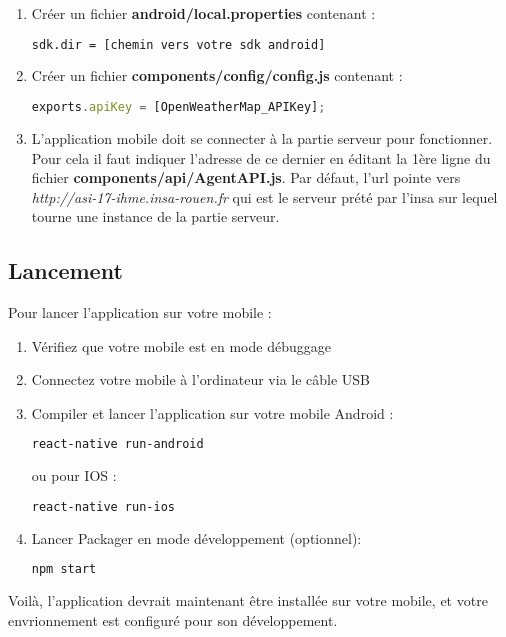 \begin{enumerate}
  \item Créer un fichier \textbf{android/local.properties} contenant :
  \begin{lstlisting}[language=bash]
  sdk.dir = [chemin vers votre sdk android]
  \end{lstlisting}
  \item Créer un fichier \textbf{components/config/config.js} contenant :
  \begin{lstlisting}[language=Javascript]
  exports.apiKey = [OpenWeatherMap_APIKey];
  \end{lstlisting}
  \item L'application mobile doit se connecter à la partie serveur pour fonctionner. Pour cela il faut indiquer l'adresse de ce dernier en
  éditant la 1ère ligne du fichier \textbf{components/api/AgentAPI.js}. Par défaut, l'url pointe vers \emph{http://asi-17-ihme.insa-rouen.fr} qui est le serveur prété
  par l'insa sur lequel tourne une instance de la partie serveur.
\end{enumerate}

\subsection{Lancement}

Pour lancer l'application sur votre mobile :
\begin{enumerate}
  \item Vérifiez que votre mobile est en mode débuggage
  \item Connectez votre mobile à l'ordinateur via le câble USB
  \item Compiler et lancer l'application sur votre mobile Android :
  \begin{lstlisting}[language=bash]
    react-native run-android
  \end{lstlisting}
  ou pour IOS :
  \begin{lstlisting}[language=bash]
    react-native run-ios
  \end{lstlisting}
  \item Lancer Packager en mode développement (optionnel):
  \begin{lstlisting}[language=bash]
    npm start
  \end{lstlisting}
\end{enumerate}

Voilà, l'application devrait maintenant être installée sur votre mobile, et votre envrionnement est configuré pour son développement.
